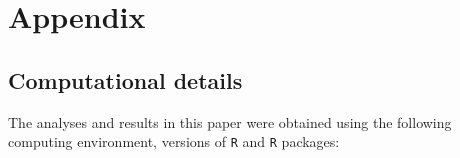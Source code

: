 \documentclass[
  11pt,
  a4paper,
]{article}
\begin{document}
\newpage
\appendix
\renewcommand{\thefigure}{A\arabic{figure}}
\renewcommand{\thetable}{A\arabic{table}}
\renewcommand{\thecodelisting}{A\arabic{codelisting}}
\setcounter{figure}{0}
\setcounter{table}{0}
\setcounter{codelisting}{0}

\section{Appendix}\label{appendix}

\subsection{Computational details}\label{computational-details}

The analyses and results in this paper were obtained using the following
computing environment, versions of \texttt{R} and \texttt{R} packages:
\end{document}
